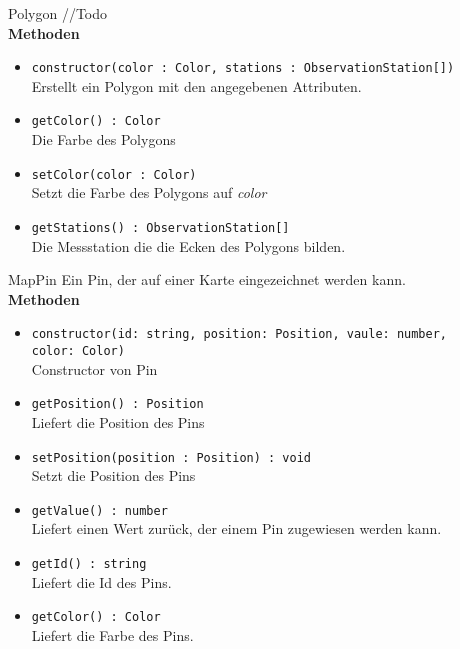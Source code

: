     \begin{Class}{Polygon}
        //Todo
        \bigskip\\
        \textbf{Methoden}
        \begin{itemize}
            \item \texttt{constructor(color : Color, stations : ObservationStation[])}
            \\ Erstellt ein Polygon mit den angegebenen Attributen.
            \item \texttt{getColor() : Color}
            \\ Die Farbe des Polygons
            \item \texttt{setColor(color : Color)}
            \\ Setzt die Farbe des Polygons auf \emph{color}
            \item \texttt{getStations() : ObservationStation[]}
            \\ Die Messstation die die Ecken des Polygons bilden.
        \end{itemize}
    \end{Class}

    \begin{Class}{MapPin}
        Ein Pin, der auf einer Karte eingezeichnet werden kann.
        \bigskip\\
        \textbf{Methoden}
        \begin{itemize}
            \item \texttt{constructor(id: string, position: Position, vaule: number,\\
            color: Color)}
            \\Constructor von Pin

            \bigskip
            \item \texttt{getPosition() : Position}
            \\ Liefert die Position des Pins
            \item \texttt{setPosition(position : Position) : void}
            \\ Setzt die Position des Pins
            \item \texttt{getValue() : number}
            \\ Liefert einen Wert zurück, der einem Pin zugewiesen werden kann.
            \item \texttt{getId() : string}
            \\ Liefert die Id des Pins.
            \item \texttt{getColor() : Color}
            \\ Liefert die Farbe des Pins.
        \end{itemize}
    \end{Class}

